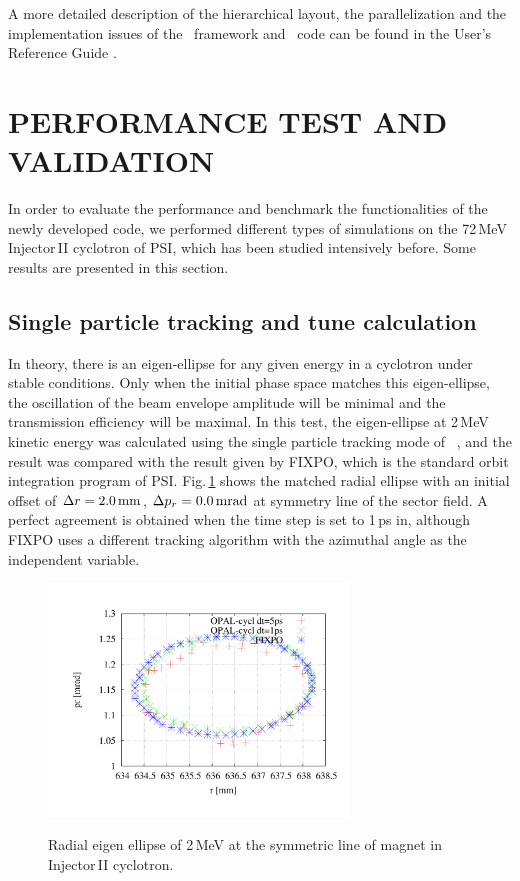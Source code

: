 \documentclass[aps,prstab,twocolumn,superscriptaddress]{revtex4}
\begin{document}
A more detailed description of the hierarchical layout, the parallelization and the implementation issues of the \opal \  framework and \opalcycl \  code
can be found in the User's Reference Guide \cite{opal:1}.  


\section{PERFORMANCE TEST AND VALIDATION}
In order to evaluate the performance and benchmark the functionalities of the newly developed code, we performed different types of simulations on
 the 72\,MeV Injector\,II cyclotron of PSI, which has been studied intensively before. Some results are presented in this section. 

\subsection{Single particle tracking and tune calculation}
In theory, there is an eigen-ellipse for any given energy in a cyclotron under stable conditions. Only when the initial phase space
matches this eigen-ellipse, the oscillation of the beam envelope amplitude will be minimal and the transmission efficiency will be maximal.
In this test, the eigen-ellipse at 2\,MeV kinetic energy was calculated using the single particle tracking mode of \opalcycl \ ,    
and the result was compared with the result given by FIXPO\cite{FIXPO:1}, which is the standard orbit integration program of PSI.
Fig.\,\ref{fig:Eigen} shows the matched radial ellipse with an initial offset of $\Delta r=2.0{\RM{\,mm}}$, $\Delta p_r=0.0{\RM{\,mrad}}$ at symmetry line of the sector field. 
A perfect agreement is obtained when the time step is set to 1\,ps in\opalcycl, although FIXPO uses a different tracking algorithm with the azimuthal angle as
the independent variable.
\begin{figure}
  {\includegraphics[width=8cm,trim=2.5cm 2.5cm 2.5cm 2.5cm]{figures/RadialEigen_Inj2.pdf}}
  \caption{Radial eigen ellipse of 2\,MeV at the symmetric line of magnet in Injector\,II cyclotron.}
  \label{fig:Eigen}
\end{figure}
\end{document}
